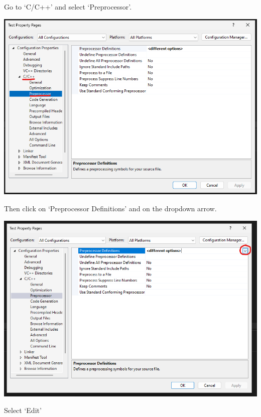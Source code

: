 \documentclass[../en-fa-lab.tex]{subfiles}
\begin{document}
Go to `C/C++' and select `Preprocessor'.

\includegraphics[width=\textwidth,alt={A screenshot of a computer Description automatically generated}]{./Resources/tutorial_lab9/image10.png}

Then click on `Preprocessor Definitions' and on the dropdown arrow.

\includegraphics[width=\textwidth,alt={A screenshot of a computer Description automatically generated}]{./Resources/tutorial_lab9/image11.png}

Select `Edit'
\end{document}
